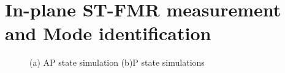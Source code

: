 \clearpage

\section{In-plane ST-FMR measurement and Mode identification}


\begin{figure}[!ht]
\centering
{}
\caption{(a) AP state simulation (b)P state simulations}
\end{figure}



